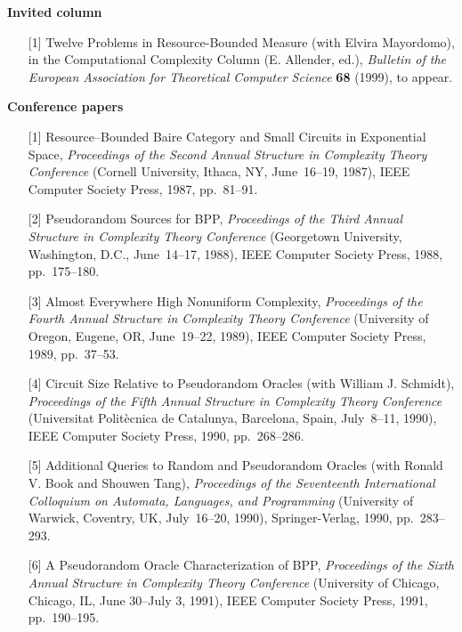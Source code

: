 \vspace*{\bigskipamount}
{\bf Invited column}

\begin{enumerate}
\item[{[1]}] Twelve Problems in Resource-Bounded Measure (with
Elvira Mayordomo), in the Computational Complexity Column (E.
Allender, ed.), {\it Bulletin of the European Association for
Theoretical Computer Science} {\bf 68} (1999), to appear.
\end{enumerate}

\vspace*{\bigskipamount}
{\bf Conference papers}

\begin{enumerate}
\item[{[1]}] Resource--Bounded Baire Category and Small Circuits in
Exponential Space, {\it Proceedings of the Second Annual Structure 
in Complexity Theory Conference}
(Cornell University, Ithaca, NY, June~16--19, 1987), IEEE Computer Society Press,
1987, pp.~81--91.
\item[{[2]}] Pseudorandom Sources for BPP, {\it Proceedings of the 
Third Annual Structure in
Complexity Theory Conference} (Georgetown University, Washington, 
 D.C., June~14--17, 1988), IEEE Computer Society Press, 1988, pp.~175--180.
\item[{[3]}] Almost Everywhere High Nonuniform Complexity, {\it 
Proceedings of the Fourth
Annual Structure in Complexity Theory Conference} (University of
Oregon, Eugene, OR, June~19--22, 1989), IEEE Computer Society Press, 1989, pp.~37--53.
\item[{[4]}] Circuit Size Relative to Pseudorandom Oracles (with
William J. Schmidt), {\it 
Proceedings of the Fifth
Annual Structure in Complexity Theory Conference}
(Universitat Polit\`ecnica de Cat\-alun\-ya, Barcelona, Spain,
July~8--11, 1990), IEEE Computer Society Press, 1990, pp.~268--286.
\item[{[5]}] Additional Queries to Random and Pseudorandom Oracles
(with Ronald V. Book and Shouwen Tang),
{\it Proceedings of the Seventeenth International Colloquium on Automata, 
Languages, and Programming} 
(University of Warwick, Coventry, UK, July~16--20, 1990), 
Springer-Verlag, 1990, 
pp.~283--293.
\item[{[6]}] A Pseudorandom Oracle Characterization of BPP, {\it 
Proceedings of the Sixth
Annual Structure in Complexity Theory Conference} (University of
Chicago, Chicago, IL, June 30--July 3, 1991), IEEE Computer Society Press, 1991, 
pp.~190--195.

\end{enumerate}
